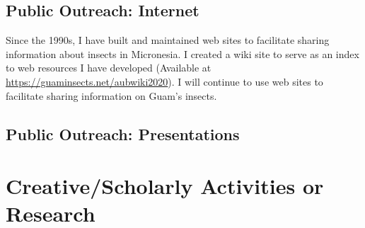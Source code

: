 \subsection{Public Outreach: Internet}

Since the 1990s, I have built and maintained web sites to facilitate sharing information about insects in Micronesia. I created a wiki site to serve as an index to web resources I have developed (Available at  \url{https://guaminsects.net/aubwiki2020}). I will continue to use web sites to facilitate sharing information on Guam's insects.

\subsection{Public Outreach: Presentations}
\begin{refsection}
	\nocite{*}
	\printbibliography[heading=none, keyword=Moore-presentations-after-2017]
\end{refsection} 

\pagebreak
\section{Creative/Scholarly Activities or Research}

